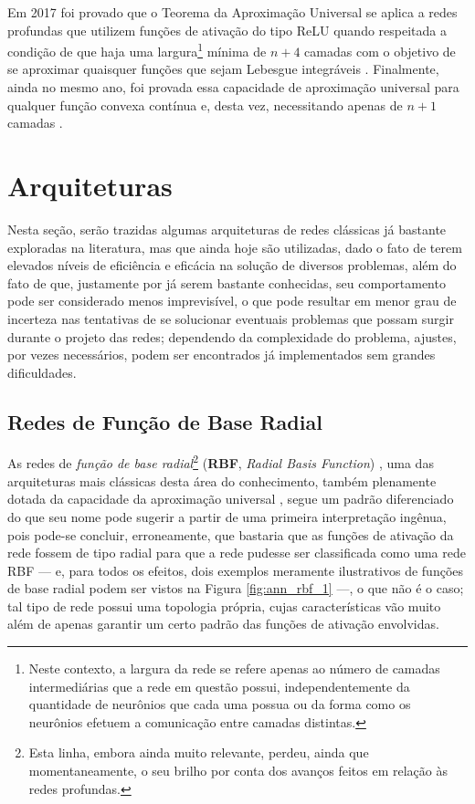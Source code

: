 Em 2017 foi provado que o Teorema da Aproximação Universal se aplica a redes profundas que utilizem funções de ativação do tipo ReLU quando respeitada a condição de que haja uma largura\footnote{Neste contexto, a largura da rede se refere apenas ao número de camadas intermediárias que a rede em questão possui, independentemente da quantidade de neurônios que cada uma possua ou da forma como os neurônios efetuem a comunicação entre camadas distintas.} mínima de $n+4$ camadas com o objetivo de se aproximar quaisquer funções que sejam Lebesgue integráveis \citep{royden1988real}. Finalmente, ainda no mesmo ano, foi provada essa capacidade de aproximação universal para qualquer função convexa contínua e, desta vez, necessitando apenas de $n+1$ camadas \citep{hanin2017universal}.


\section{Arquiteturas}
\label{sec:ann_architectures}


Nesta seção, serão trazidas algumas arquiteturas de redes clássicas já bastante exploradas na literatura, mas que ainda hoje são utilizadas, dado o fato de terem elevados níveis de eficiência e eficácia na solução de diversos problemas, além do fato de que, justamente por já serem bastante conhecidas, seu comportamento pode ser considerado menos imprevisível, o que pode resultar em menor grau de incerteza nas tentativas de se solucionar eventuais problemas que possam surgir durante o projeto das redes; dependendo da complexidade do problema, ajustes, por vezes necessários, podem ser encontrados já implementados sem grandes dificuldades.




\subsection{Redes de Função de Base Radial}
\label{subsec:ann_rbf_nets}

As redes de \textit{função de base radial}\footnote{Esta linha, embora ainda muito relevante, perdeu, ainda que momentaneamente, o seu brilho por conta dos avanços feitos em relação às redes profundas.} (\textbf{RBF}, \textit{Radial Basis Function}) \citep{broomhead1988radial}, uma das arquiteturas mais clássicas desta área do conhecimento, também plenamente dotada da capacidade da aproximação universal \citep{park1991universal}, segue um padrão diferenciado do que seu nome pode sugerir a partir de uma primeira interpretação ingênua, pois pode-se concluir, erroneamente, que bastaria que as funções de ativação da rede fossem de tipo radial para que a rede pudesse ser classificada como uma rede RBF --- e, para todos os efeitos, dois exemplos meramente ilustrativos de funções de base radial podem ser vistos na Figura \ref{fig:ann_rbf_1} ---, o que não é o caso; tal tipo de rede possui uma topologia própria, cujas características vão muito além de apenas garantir um certo padrão das funções de ativação envolvidas.

